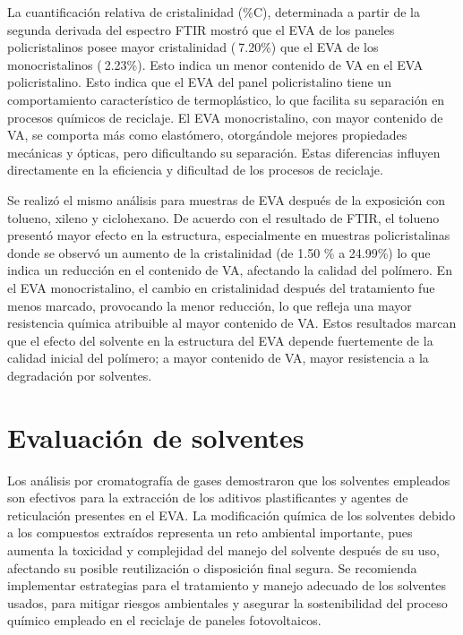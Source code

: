  La cuantificación relativa de cristalinidad (\%C), determinada a partir de la segunda derivada del espectro FTIR mostró que el EVA de los paneles policristalinos posee mayor cristalinidad ($~$7.20\%) que el EVA de los monocristalinos ($~$2.23\%). Esto indica un menor contenido de VA en el EVA policristalino. Esto indica que el EVA del panel policristalino tiene un comportamiento característico de termoplástico, lo que facilita su separación en procesos químicos de reciclaje. El EVA monocristalino, con mayor contenido de VA, se comporta más como elastómero, otorgándole mejores propiedades mecánicas y ópticas, pero dificultando su separación. Estas diferencias influyen directamente en la eficiencia y dificultad de los procesos de reciclaje.
 
 Se realizó el mismo análisis para muestras de EVA después de la exposición con tolueno, xileno y ciclohexano. De acuerdo con el resultado de FTIR, el tolueno presentó mayor efecto en la estructura, especialmente en muestras policristalinas donde se observó un aumento de la cristalinidad (de 1.50 \% a 24.99\%) lo que indica un reducción en el contenido de VA, afectando la calidad del polímero. En el EVA monocristalino, el cambio en cristalinidad después del tratamiento fue menos marcado, provocando la menor reducción, lo que refleja una mayor resistencia química atribuible al mayor contenido de VA.
 Estos resultados marcan que el efecto del solvente en la estructura del EVA depende fuertemente de la calidad inicial del polímero; a mayor contenido de VA, mayor resistencia a la degradación por solventes.
 
 \section{Evaluación de solventes}
 \label{sec:Conclusiones solventes}
 
 Los análisis por cromatografía de gases demostraron que los solventes empleados son efectivos para la extracción de los aditivos plastificantes y agentes de reticulación presentes en el EVA. La modificación química de los solventes debido a los compuestos extraídos representa un reto ambiental importante, pues aumenta la toxicidad y complejidad del manejo del solvente después de su uso, afectando su posible reutilización o disposición final segura. 
 Se recomienda implementar estrategias para el tratamiento y manejo adecuado de los solventes usados, para mitigar riesgos ambientales y asegurar la sostenibilidad del proceso químico empleado en el reciclaje de paneles fotovoltaicos. 
 
